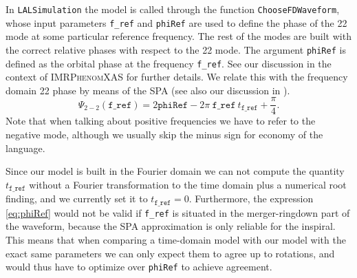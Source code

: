 \documentclass[twocolumn,prd,aps,superscriptaddress,preprintnumbers,tightenlines,showpacs,nofootinbib,eqsecnum,amsfonts,amsmath]{revtex4}
\newcommand{\phX}{\textsc{IMRPhenomXAS}\xspace}
\begin{document}
In \texttt{LALSimulation} the model is called through the function \texttt{ChooseFDWaveform}, whose input parameters \texttt{f\_ref} and \texttt{phiRef} are used to define the phase of the 22 mode at some particular reference frequency. The rest of the modes are built with the correct relative phases with respect to the 22 mode. The argument  \texttt{phiRef} is defined as the orbital phase at the frequency \texttt{f\_ref}. 
See our discussion in the context of \phX \cite{phenX} for further details.
We relate this with the frequency domain 22 phase by means of the SPA (see also our discussion in \cite{phenX}).
\begin{equation}
\label{eq:phiRef}
\Psi_{2-2}(\texttt{f\_ref}) = 2 \texttt{phiRef} - 2\pi \: \texttt{f\_ref} \:t_{\texttt{f\_ref}} + \frac{\pi}{4}.
\end{equation}
Note that when talking about positive frequencies we have to refer to the negative mode, although we usually skip the minus sign for economy of the language.

Since our model is built in the Fourier domain we can not compute the quantity $t_{\texttt{f\_ref}}$ without a Fourier transformation to the time domain plus a numerical root finding, and we currently set it to  $t_{\texttt{f\_ref}}=0$. 
%
Furthermore, the expression \ref{eq:phiRef} would not be valid if \texttt{f\_ref} is situated in the merger-ringdown part of the waveform, because the SPA approximation is only reliable for the inspiral. This means that when comparing a time-domain model with our model with the exact same parameters we    can only expect them to agree up to rotations,
and would thus have to optimize over \texttt{phiRef} to achieve agreement.
\end{document}
